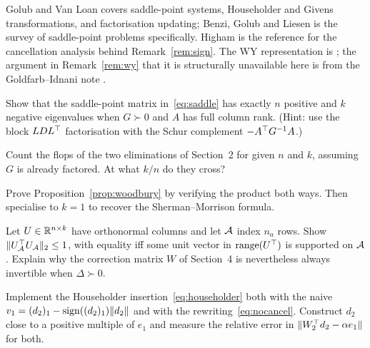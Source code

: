 \begin{notes}
Golub and Van Loan \cite{golub2013} covers saddle-point systems, Householder and
Givens transformations, and factorisation updating; Benzi, Golub and Liesen
\cite{benzi2005} is the survey of saddle-point problems specifically. Higham
\cite{higham2002} is the reference for the cancellation analysis behind
Remark~\ref{rem:sign}. The WY representation is \cite{bischof1987,schreiber1989};
the argument in Remark~\ref{rem:wy} that it is structurally unavailable here is
from the Goldfarb--Idnani note \cite{schmelzer2026quadprog}.
\end{notes}

\begin{exercises}

\begin{exercise}
Show that the saddle-point matrix in~\eqref{eq:saddle} has exactly $n$ positive and
$k$ negative eigenvalues when $G \succ 0$ and $A$ has full column rank. (Hint: use
the block $LDL^{\top}$ factorisation with the Schur complement $-A^{\top} G^{-1}A$.)
\end{exercise}

\begin{exercise}
Count the flops of the two eliminations of Section~2 for given $n$ and $k$,
assuming $G$ is already factored. At what $k/n$ do they cross?
\end{exercise}

\begin{exercise}
Prove Proposition~\ref{prop:woodbury} by verifying the product both ways. Then
specialise to $k = 1$ to recover the Sherman--Morrison formula.
\end{exercise}

\begin{exercise}
Let $U \in \mathbb{R}^{n\times k}$ have orthonormal columns and let $\mathcal{A}$ index $n_a$
rows. Show $\lVert U_{\mathcal{A}}^{\top} U_{\mathcal{A}} \rVert_2 \le 1$, with equality iff some unit
vector in $\operatorname{range}(U^{\top})$ is supported on $\mathcal{A}$. Explain why the correction
matrix $W$ of Section~4 is nevertheless always invertible when $\Delta \succ 0$.
\end{exercise}

\begin{exercise}
Implement the Householder insertion~\eqref{eq:householder} both with the naive
$v_1 = (d_2)_1 - \operatorname{sign}((d_2)_1)\lVert d_2 \rVert$ and with the rewriting~\eqref{eq:nocancel}.
Construct $d_2$ close to a positive multiple of $e_1$ and measure the relative
error in $\lVert W_2^{\top} d_2 - \alpha e_1 \rVert$ for both.
\end{exercise}


\end{exercises}
